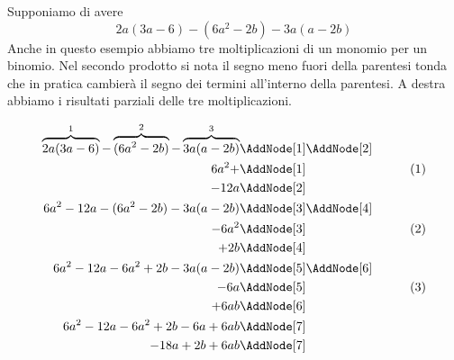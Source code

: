 \begin{esempiot}{}{}
Supponiamo di avere \[2a(3a-6)-(6a^2-2b)-3a(a-2b)\]
Anche in questo esempio abbiamo tre moltiplicazioni di un monomio per un binomio. Nel secondo prodotto si nota il segno meno fuori della parentesi tonda che in pratica cambierà il segno dei termini all'interno della parentesi. A destra abbiamo  i risultati parziali delle tre moltiplicazioni.
\begin{NodesList}
	\begin{align*}
		\overbrace{2a(3a-6)}^{1}-\overbrace{(6a^2-2b)}^{2}-\overbrace{3a(a-2b)}^{3}&\AddNode[1]\AddNode[2]\\
		6a^2+&\AddNode[1]&\tag{1}\\ 
		-12a&\AddNode[2]&\\
		6a^2-12a-(6a^2-2b)-3a(a-2b)&\AddNode[3]\AddNode[4]\\
		-6a^2&\AddNode[3]&\tag{2}\\    
		+2b&\AddNode[4]&\\
		6a^2-12a-6a^2+2b-3a(a-2b)&\AddNode[5]\AddNode[6]\\
		-6a&\AddNode[5]&\tag{3}\\
		+6ab&\AddNode[6]&\\
		6a^2-12a-6a^2+2b-6a+6ab&\AddNode[7]\\   
		-18a+2b+6ab&\AddNode[7]   
	\end{align*}
\end{NodesList}
\end{esempiot}
